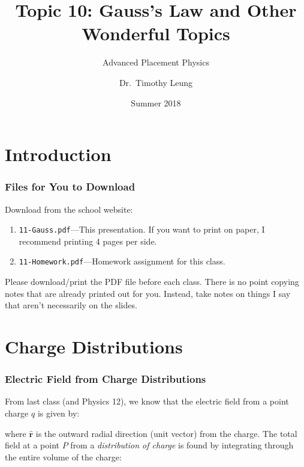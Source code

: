 \documentclass[12pt,aspectratio=169]{beamer}
\title{Topic 10: Gauss's Law and Other Wonderful Topics}
\subtitle{Advanced Placement Physics}
\author[TML]{Dr.\ Timothy Leung}
\institute{Olympiads School}
\date{Summer 2018}
\newcommand{\mb}[1]{\mathbf{#1}}
\newcommand{\eq}[2]{\vspace{#1}{\Large\begin{displaymath}#2\end{displaymath}}}
\begin{document}
\begin{frame}
  \maketitle
\end{frame}


\section[Intro]{Introduction}

\begin{frame}
  \frametitle{Files for You to Download}
  Download from the school website:
  \begin{enumerate}
  \item\texttt{11-Gauss.pdf}---This presentation. If you want to print on
    paper, I recommend printing 4 pages per side.
  \item\texttt{11-Homework.pdf}---Homework assignment for this class.
  \end{enumerate}

  \vspace{.2in}Please download/print the PDF file before each class. There is
  no point copying notes that are already printed out for you. Instead, take
  notes on things I say that aren't necessarily on the slides.
\end{frame}



\section{Charge Distributions}

\begin{frame}
  \frametitle{Electric Field from Charge Distributions}

  From last class (and Physics 12), we know that the electric field from a
  point charge $q$ is given by:

  \eq{-.2in}{\mb{E}=\frac{kq}{r^2}\hat{\mb{r}}}
  
  where $\hat{\mb{r}}$ is the outward radial direction (unit vector) from the
  charge. The total field at a point $P$ from a \emph{distribution of charge}
  is found by integrating through the entire volume of the charge:

  \eq{-.2in}{\boxed{\mb{E}=\int_V\frac{kdq}{r^2}\hat{\mb{r}}}}
\end{frame}
\end{document}
